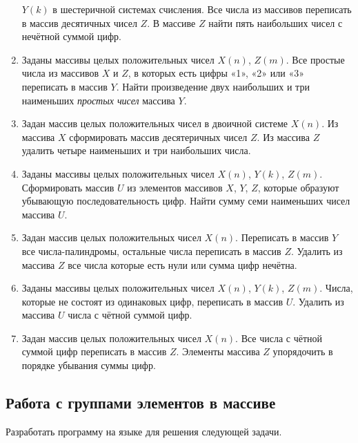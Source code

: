 \begin{enumerate}
$Y(k)$ в  шестеричной системах счисления. Все числа из массивов переписать в массив десятичных
чисел $Z$. В массиве $Z$ найти пять наибольших чисел с нечётной суммой цифр.
\item Заданы массивы целых положительных чисел $X(n)$, $Z(m)$. Все
простые числа из массивов $X$ и $Z$, в которых есть цифры «1», «2» или «3» переписать в
массив $Y$. Найти произведение двух наибольших и три наименьших \emph{простых
чисел} массива $Y$.
\item Задан массив целых положительных чисел в двоичной системе $X(n)$. Из массива
$X$ сформировать массив десятеричных чисел $Z$. Из массива $Z$ удалить
четыре наименьших и три наибольших числа.
\item Заданы массивы целых положительных чисел $X(n)$, $Y(k)$,
$Z(m)$. Сформировать массив $U$ из элементов массивов $X$,
$Y$, $Z$, которые образуют убывающую последовательность цифр. Найти сумму семи
наименьших чисел массива $U$.
\item Задан массив целых положительных чисел $X(n)$. Переписать в массив $Y$
все числа-палиндромы, остальные числа переписать в массив $Z$. Удалить из массива $Z$ все числа
которые есть нули или сумма цифр нечётна.
\item Заданы массивы целых положительных чисел $X(n)$, $Y(k)$,
$Z(m)$. Числа, которые не состоят из одинаковых цифр, переписать в массив $U$.
Удалить из массива $U$ числа с чётной суммой цифр.
\item Задан массив целых положительных чисел $X(n)$. Все числа с чётной суммой цифр  переписать
в массив $Z$. Элементы массива $Z$ упорядочить в порядке убывания суммы цифр.
\end{enumerate}

\subsection[Работа с группами элементов в массиве]{Работа с группами элементов в массиве}
Разработать программу на языке  для решения следующей задачи.

